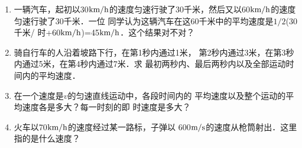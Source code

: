 \begin{enumerate}
    \item 一辆汽车，起初以30$\text{km}/\text{h}$的速度匀速行驶了30千米，然后又以60$\text{km}/\text{h}$的速度匀速行驶了30千米．一位
    同学认为这辆汽车在这60千米中的平均速度是$1/2$(30千米/
    时+60$\text{km}/\text{h}$)=45$\text{km}/\text{h}$．这个结果对不对？
    \item 骑自行车的人沿着坡路下行，在第1秒内通过1米，
    第2秒内通过3米，在第3秒内通过5米，在第4秒内通过7米．求
    最初两秒内、最后两秒内以及全部运动时间内的平均速度．
    \item 在一个速度是$v$的匀速直线运动中，各段时间内的
    平均速度以及整个运动的平均速度各是多大？每一时刻的即
    时速度是多大？
    \item 火车以70$\text{km}/\text{h}$的速度经过某一路标，子弹以
    600$\text{m}/\text{s}$的速度从枪筒射出．这里指的是什么速度？
    
\end{enumerate}














